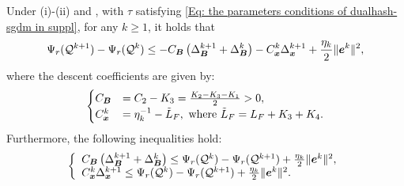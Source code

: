 \begin{lemma}
\label{Lemma: approximate sufficient descent property storm}
    Under (i)-(ii) and , with $\tau$ satisfying \eqref{Eq: the parameters conditions of dualhash-sgdm in suppl}, for any $k \geq 1$, it holds that
    \begin{align}
        \label{Eq: the descent property of Lyapunov func in storm}\Psi_r(\mathcal{Q}^{k+1}) - \Psi_r(\mathcal{Q}^{k}) \leq -C_{\bm{B}}\left( \Delta_{\bm{B}}^{k+1}+ \Delta_{\bm{B}}^{k}\right)- C_{\bm{x}}^{k}\Delta_{\bm{x}}^{k+1}+ \frac{\eta_{k}}{2}\| \bm{e}^{k}\|^{2},
    \end{align}
    where the descent coefficients are given by:
    \begin{align}
        \begin{cases}C_{\bm{B}}&= C_{2}- K_{3}= \frac{K_2 - K_3 -K_1}{2}>0, \\ C_{\bm{x}}^{k}&=\eta_{k}^{-1}- \tilde{L}_{F}, \text{ where }\tilde{L}_{F}= L_{F}+ K_{3}+ K_{4}.\end{cases} \notag 
    \end{align}
    Furthermore, the following inequalities hold:
    \begin{align}
        \label{Eq: bound B and x in storm}
        \left\{ \begin{array}{ll}C_{\bm{B}} \left( \Delta_{\bm{B}}^{k+1} + \Delta_{\bm{B}}^k \right) \leq \Psi_r(\mathcal{Q}^k) - \Psi_r(\mathcal{Q}^{k+1}) + \frac{\eta_{k}}{2} \| \bm{e}^k\|^2, \\ C_{\bm{x}}^k \Delta_{\bm{x}}^{k+1} \leq \Psi_r(\mathcal{Q}^k) - \Psi_r(\mathcal{Q}^{k+1}) +\frac{\eta_{k}}{2} \| \bm{e}^k\|^2.\end{array} \right.
    \end{align}
\end{lemma}



